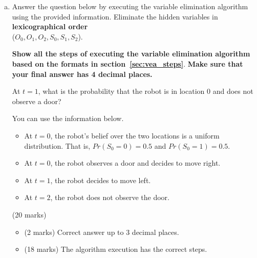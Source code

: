 \documentclass[12pt]{article}
\begin{document}
\begin{enumerate}[(a)]
\begin{problem}
\end{problem}

\begin{markscheme}
(2 marks) Correct answer up to 3 decimal places. All or nothing.

\end{markscheme}


\item
\label{q1_general}
Answer the question below by executing the variable elimination algorithm using the provided information. 
Eliminate the hidden variables in {\bf lexicographical order} \\
($O_0, O_1, O_2, S_0, S_1, S_2$). 

{\bf Show all the steps of executing the variable elimination algorithm based on the formats in section~\ref{sec:vea_steps}}. {\bf Make sure that your final answer has 4 decimal places.}

\begin{problem}
At $t=1$, what is the probability that the robot is in location $0$ and does not observe a door? 

You can use the information below.
\begin{itemize}
    \item At $t=0$, the robot's belief over the two locations is a uniform distribution.  That is, $Pr(S_0 = 0) = 0.5$ and $Pr(S_0 = 1) = 0.5$.
    \item At $t=0$, the robot observes a door and decides to move right.
    \item At $t=1$, the robot decides to move left.
    \item At $t=2$, the robot does not observe the door.
\end{itemize}
\end{problem}


\begin{markscheme}
(20 marks)

\begin{itemize} 
\item
(2 marks) Correct answer up to 3 decimal places.
\item 
(18 marks) The algorithm execution has the correct steps.
\end{itemize}

\end{markscheme}



\end{enumerate}
\end{document}
